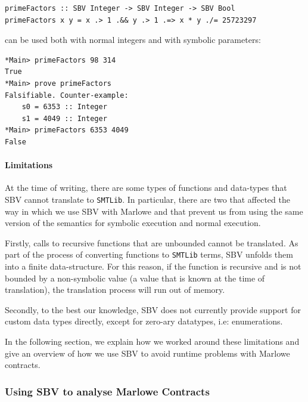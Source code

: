 \documentclass[runningheads]{llncs}
\begin{document}
\begin{verbatim}
primeFactors :: SBV Integer -> SBV Integer -> SBV Bool
primeFactors x y = x .> 1 .&& y .> 1 .=> x * y ./= 25723297
\end{verbatim}

\noindent
can be used both with normal integers and with symbolic parameters:
\begin{verbatim}
*Main> primeFactors 98 314
True
*Main> prove primeFactors
Falsifiable. Counter-example:
    s0 = 6353 :: Integer
    s1 = 4049 :: Integer
*Main> primeFactors 6353 4049
False
\end{verbatim}

\paragraph{Limitations}

At the time of writing, there are some types of functions and data-types that SBV cannot translate to \texttt{SMTLib}. In particular, there are two that affected the way in which we use SBV with Marlowe and that prevent us from using the same version of the semantics for symbolic execution and normal execution.

Firstly, calls to recursive functions that are unbounded cannot be translated. As part of the process of converting functions to \texttt{SMTLib} terms, SBV unfolds them into a finite data-structure. For this reason, if the function is recursive and is not bounded by a non-symbolic value (a value that is known at the time of translation), the translation process will run out of memory.

Secondly, to the best our knowledge, SBV does not currently provide support for custom data types directly, except for zero-ary datatypes, i.e: enumerations.

In the following section, we explain how we worked around these limitations and give an overview of how we use SBV to avoid runtime problems with Marlowe contracts.

\subsubsection{Using SBV to analyse Marlowe Contracts}
\end{document}
